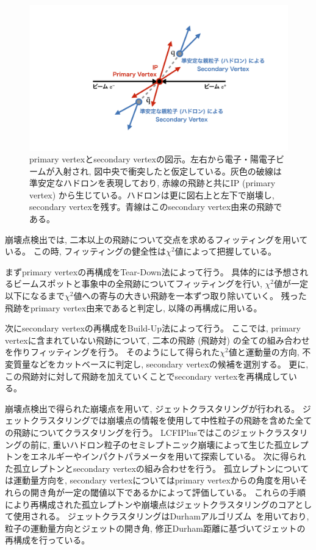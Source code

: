 \begin{figure}[htbp]
 \centering
 \includegraphics[trim = 0 100 0 100, width=1.0\textwidth, clip]{Figure/1Introduction/6ReconstructedVertex.png}
 \caption[primary vertexとsecondary vertexの図示]{primary vertexとsecondary vertexの図示。左右から電子・陽電子ビームが入射され, 図中央で衝突したと仮定している。灰色の破線は準安定なハドロンを表現しており, 赤線の飛跡と共にIP (primary vertex) から生じている。ハドロンは更に図右上と左下で崩壊し, secondary vertexを残す。青線はこのsecondary vertex由来の飛跡である。}
 \label{6ReconstructedVertex}
\end{figure}

崩壊点検出では, 二本以上の飛跡について交点を求めるフィッティングを用いている。
この時, フィッティングの健全性は$\chi^2$値によって把握している。

まずprimary vertexの再構成をTear-Down法によって行う。
具体的には予想されるビームスポットと事象中の全飛跡についてフィッティングを行い, $\chi^2$値が一定以下になるまで$\chi^2$値への寄与の大きい飛跡を一本ずつ取り除いていく。
残った飛跡をprimary vertex由来であると判定し, 以降の再構成に用いる。

次にsecondary vertexの再構成をBuild-Up法によって行う。
ここでは, primary vertexに含まれていない飛跡について, 二本の飛跡 (飛跡対) の全ての組み合わせを作りフィッティングを行う。
そのようにして得られた$\chi^2$値と運動量の方向, 不変質量などをカットベースに判定し, secondary vertexの候補を選別する。
更に, この飛跡対に対して飛跡を加えていくことでsecondary vertexを再構成している。

崩壊点検出で得られた崩壊点を用いて, ジェットクラスタリングが行われる。
ジェットクラスタリングでは崩壊点の情報を使用して中性粒子の飛跡を含めた全ての飛跡についてクラスタリングを行う。
LCFIPlusではこのジェットクラスタリングの前に, 重いハドロン粒子のセミレプトニック崩壊によって生じた孤立レプトンをエネルギーやインパクトパラメータを用いて探索している。
次に得られた孤立レプトンとsecondary vertexの組み合わせを行う。
孤立レプトンについては運動量方向を, secondary vertexについてはprimary vertexからの角度を用いそれらの開き角が一定の閾値以下であるかによって評価している。
これらの手順により再構成された孤立レプトンや崩壊点はジェットクラスタリングのコアとして使用される。
ジェットクラスタリングはDurhamアルゴリズム~\cite{Durhampaper}を用いており, 粒子の運動量方向とジェットの開き角, 修正Durham距離に基づいてジェットの再構成を行っている。

